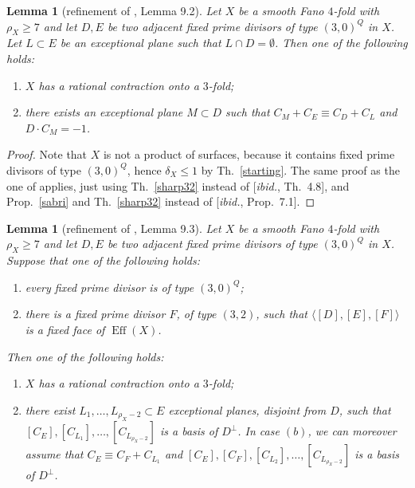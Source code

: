 \documentclass[a4paper,12pt]{amsart}
\newtheorem{lemma}[thm]{Lemma}
\theoremstyle{definition}
\numberwithin{figure}{section}
\numberwithin{table}{section}
\newcommand{\Eff}{\operatorname{Eff}}
\begin{document}
    \begin{lemma}[refinement of \cite{small}, Lemma 9.2]\label{9.2}
      Let $X$ be a smooth Fano $4$-fold with $\rho_X\geq 7$ and let $D,E$ be two adjacent fixed prime divisors of type $(3,0)^Q$ in $X$. Let $L\subset E$ be an exceptional plane such that $L\cap D=\emptyset$. 
Then one of the following holds:
  \begin{enumerate}[$(i)$]
  \item $X$ has a rational contraction onto a $3$-fold;
    \item there exists an exceptional plane $M\subset D$ such that $C_M+C_E\equiv C_D+C_L$ and $D\cdot C_M=-1$.
    \end{enumerate}
       \end{lemma} 
       \begin{proof} Note that $X$ is not a product of surfaces, because it contains fixed prime divisors of type $(3,0)^Q$, hence $\delta_X\leq 1$ by Th.~\ref{starting}.
The same proof as the one of \cite[Lemma 9.2]{small} applies, just using Th.~\ref{sharp32} instead of [\emph{ibid.}, Th.~4.8], and Prop.~\ref{sabri} and Th.~\ref{sharp32} instead of [\emph{ibid.}, Prop.~7.1].
\end{proof}
 \begin{lemma}[refinement of \cite{small}, Lemma 9.3]\label{9.3}
   Let $X$ be a smooth Fano $4$-fold with $\rho_X\geq 7$ and let $D,E$ be two adjacent fixed prime divisors of type $(3,0)^Q$ in $X$. Suppose that one of the following holds:
   \begin{enumerate}[$(a)$]
   \item every fixed prime divisor is of type $(3,0)^Q$;
   \item there is a fixed prime divisor $F$, of type $(3,2)$, such that $\langle [D],[E],[F]\rangle$ is a fixed face of $\Eff(X)$.
       \end{enumerate}
Then one of the following holds:
  \begin{enumerate}[$(i)$]
  \item $X$ has a rational contraction onto a $3$-fold;
  \item there exist
$L_1,\dotsc,L_{\rho_X-2}\subset E$ exceptional planes, disjoint from $D$, such that $[C_E],[C_{L_1}],\dotsc,[C_{L_{\rho_X-2}}]$ is a basis of $D^{\perp}$. In case $(b)$, we can moreover assume that $C_E\equiv C_F+C_{L_1}$ and $[C_E],[C_F],[C_{L_2}],\dotsc,[C_{L_{\rho_X-2}}]$ is a basis of $D^{\perp}$.
    \end{enumerate}
       \end{lemma} 
\end{document}
